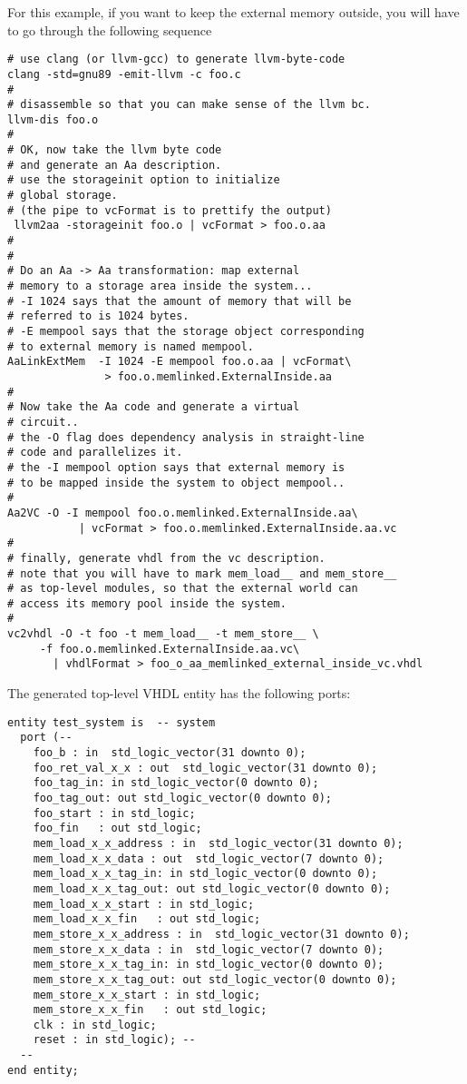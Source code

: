 \documentclass{article}
\begin{document}
For this example, if you want to keep the external memory
outside, you will have to go through the following sequence
\begin{verbatim}
# use clang (or llvm-gcc) to generate llvm-byte-code
clang -std=gnu89 -emit-llvm -c foo.c
#
# disassemble so that you can make sense of the llvm bc.
llvm-dis foo.o
#
# OK, now take the llvm byte code
# and generate an Aa description.
# use the storageinit option to initialize
# global storage.
# (the pipe to vcFormat is to prettify the output)
 llvm2aa -storageinit foo.o | vcFormat > foo.o.aa
#
#
# Do an Aa -> Aa transformation: map external
# memory to a storage area inside the system...
# -I 1024 says that the amount of memory that will be
# referred to is 1024 bytes.
# -E mempool says that the storage object corresponding
# to external memory is named mempool.
AaLinkExtMem  -I 1024 -E mempool foo.o.aa | vcFormat\
               > foo.o.memlinked.ExternalInside.aa
#
# Now take the Aa code and generate a virtual
# circuit..
# the -O flag does dependency analysis in straight-line
# code and parallelizes it.
# the -I mempool option says that external memory is
# to be mapped inside the system to object mempool..
#
Aa2VC -O -I mempool foo.o.memlinked.ExternalInside.aa\
           | vcFormat > foo.o.memlinked.ExternalInside.aa.vc
#
# finally, generate vhdl from the vc description.
# note that you will have to mark mem_load__ and mem_store__
# as top-level modules, so that the external world can
# access its memory pool inside the system.
#
vc2vhdl -O -t foo -t mem_load__ -t mem_store__ \ 
     -f foo.o.memlinked.ExternalInside.aa.vc\
       | vhdlFormat > foo_o_aa_memlinked_external_inside_vc.vhdl
\end{verbatim}

The generated top-level VHDL entity has the following
ports:
\begin{verbatim}
entity test_system is  -- system
  port (--
    foo_b : in  std_logic_vector(31 downto 0);
    foo_ret_val_x_x : out  std_logic_vector(31 downto 0);
    foo_tag_in: in std_logic_vector(0 downto 0);
    foo_tag_out: out std_logic_vector(0 downto 0);
    foo_start : in std_logic;
    foo_fin   : out std_logic;
    mem_load_x_x_address : in  std_logic_vector(31 downto 0);
    mem_load_x_x_data : out  std_logic_vector(7 downto 0);
    mem_load_x_x_tag_in: in std_logic_vector(0 downto 0);
    mem_load_x_x_tag_out: out std_logic_vector(0 downto 0);
    mem_load_x_x_start : in std_logic;
    mem_load_x_x_fin   : out std_logic;
    mem_store_x_x_address : in  std_logic_vector(31 downto 0);
    mem_store_x_x_data : in  std_logic_vector(7 downto 0);
    mem_store_x_x_tag_in: in std_logic_vector(0 downto 0);
    mem_store_x_x_tag_out: out std_logic_vector(0 downto 0);
    mem_store_x_x_start : in std_logic;
    mem_store_x_x_fin   : out std_logic;
    clk : in std_logic;
    reset : in std_logic); --
  --
end entity;
\end{verbatim}
\end{document}
